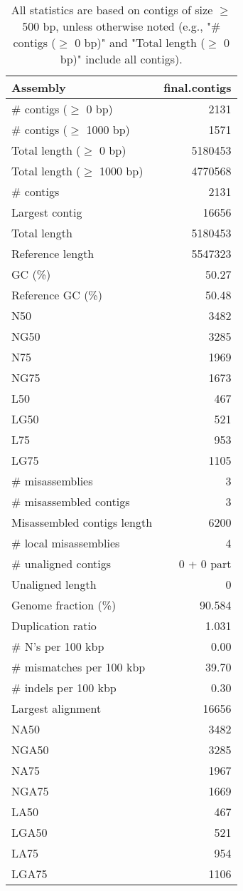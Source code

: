 \documentclass[12pt,a4paper]{article}
\begin{document}
\begin{table}[ht]
\begin{center}
\caption{All statistics are based on contigs of size $\geq$ 500 bp, unless otherwise noted (e.g., "\# contigs ($\geq$ 0 bp)" and "Total length ($\geq$ 0 bp)" include all contigs).}
\begin{tabular}{|l*{1}{|r}|}
\hline
Assembly & final.contigs \\ \hline
\# contigs ($\geq$ 0 bp) & 2131 \\ \hline
\# contigs ($\geq$ 1000 bp) & 1571 \\ \hline
Total length ($\geq$ 0 bp) & 5180453 \\ \hline
Total length ($\geq$ 1000 bp) & 4770568 \\ \hline
\# contigs & 2131 \\ \hline
Largest contig & 16656 \\ \hline
Total length & 5180453 \\ \hline
Reference length & 5547323 \\ \hline
GC (\%) & 50.27 \\ \hline
Reference GC (\%) & 50.48 \\ \hline
N50 & 3482 \\ \hline
NG50 & 3285 \\ \hline
N75 & 1969 \\ \hline
NG75 & 1673 \\ \hline
L50 & 467 \\ \hline
LG50 & 521 \\ \hline
L75 & 953 \\ \hline
LG75 & 1105 \\ \hline
\# misassemblies & 3 \\ \hline
\# misassembled contigs & 3 \\ \hline
Misassembled contigs length & 6200 \\ \hline
\# local misassemblies & 4 \\ \hline
\# unaligned contigs & 0 + 0 part \\ \hline
Unaligned length & 0 \\ \hline
Genome fraction (\%) & 90.584 \\ \hline
Duplication ratio & 1.031 \\ \hline
\# N's per 100 kbp & 0.00 \\ \hline
\# mismatches per 100 kbp & 39.70 \\ \hline
\# indels per 100 kbp & 0.30 \\ \hline
Largest alignment & 16656 \\ \hline
NA50 & 3482 \\ \hline
NGA50 & 3285 \\ \hline
NA75 & 1967 \\ \hline
NGA75 & 1669 \\ \hline
LA50 & 467 \\ \hline
LGA50 & 521 \\ \hline
LA75 & 954 \\ \hline
LGA75 & 1106 \\ \hline
\end{tabular}
\end{center}
\end{table}
\end{document}
